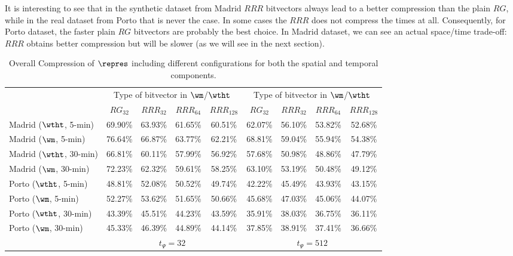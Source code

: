 It is interesting to see that in the synthetic dataset from Madrid $RRR$ bitvectors always lead to a better 
compression than the plain $RG$, while in the real dataset from Porto that is never the case. 
In some cases the $RRR$ does not compress the times at all. Consequently, for Porto dataset, the faster plain $RG$ 
bitvectors are probably the best choice. In Madrid dataset, we can see an actual space/time trade-off: $RRR$ obtains better
compression but will be slower (as we will see in the next section).



\begin{table}[ht!]
\begin{center}
\scriptsize
\setlength\tabcolsep{2pt}
  \begin{tabular}{|l|*{4}{c}|*{4}{c}|}
  \cline{2-9}
  \multicolumn{1}{c|}{} & \multicolumn{4}{c|}{Type of bitvector in $\wm$/$\wtht$}& \multicolumn{4}{c|}{Type of bitvector in $\wm$/$\wtht$} \\

  \multicolumn{1}{c|}{}     &$RG_{32}$& $RRR_{32}$& $RRR_{64}$&$RRR_{128}$&$RG_{32}$& $RRR_{32}$& $RRR_{64}$&$RRR_{128}$ \\
  \hline                                             
  Madrid ($\wtht$, 5-min)  & 69.90\% &   63.93\% &   61.65\% &   60.51\% & 62.07\% &	56.10\% &	53.82\% &	 52.68\% \\
  Madrid ($\wm$, 5-min)     & 76.64\% &   66.87\% &   63.77\% &   62.21\% & 68.81\% &	59.04\% &	55.94\% &	 54.38\% \\
  Madrid ($\wtht$, 30-min) & 66.81\% &   60.11\% &   57.99\% &   56.92\% & 57.68\% &	50.98\% &	48.86\% &	 47.79\% \\
  Madrid ($\wm$, 30-min)    & 72.23\% &   62.32\% &   59.61\% &   58.25\% & 63.10\% &	53.19\% &	50.48\% &	 49.12\% \\
  \hline
  Porto ($\wtht$, 5-min)   & 48.81\% &   52.08\% &   50.52\% &   49.74\% & 42.22\% &	45.49\% &	43.93\% &	 43.15\% \\
  Porto ($\wm$, 5-min)      & 52.27\% &   53.62\% &   51.65\% &   50.66\% & 45.68\% &	47.03\% &	45.06\% &	 44.07\% \\
  Porto ($\wtht$, 30-min)  & 43.39\% &   45.51\% &   44.23\% &   43.59\% & 35.91\% &	38.03\% &	36.75\% &	 36.11\% \\
  Porto ($\wm$, 30-min)     & 45.33\% &   46.39\% &   44.89\% &   44.14\% & 37.85\% &	38.91\% &	37.41\% &	 36.66\% \\
  \hline
  \cline{2-9}
  \multicolumn{1}{c|}{} & \multicolumn{4}{c|}{$t_{\Psi}=32$}& \multicolumn{4}{c|}{$t_{\Psi}=512$} \\
    \cline{2-9}
  \end{tabular}
\caption{Overall Compression of $\repres$ including different configurations for both the spatial and temporal components.  }
\label{table:ctr_spaces}
\vspace{-4mm}
\end{center}
\end{table}


